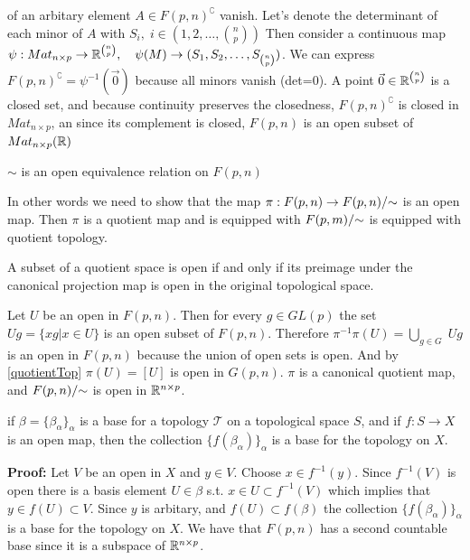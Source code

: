 \documentclass[11pt,a4paper]{report}
\begin{document}
of an arbitary element $ A \in F(p,n)^\complement$ vanish. Let's denote the determinant of each minor of $A$ with $S_i, \; i\in (1,2, \dots ,  {n \choose p})$ 
Then consider a continuous map
$ \psi: Mat_{n \times p} \to \mathbb{R}^{ n \choose p}, \quad \psi(M) \to (S_1,S_2, \dots, S_{n \choose p})$.
We can express $F(p,n)^\complement = \psi ^{-1} ( \vec{0} )$ because all minors vanish (det=0).
A point $ \vec{0} \in \mathbb{R}^{n \choose p}$ is a closed set, and because continuity preserves the closedness, $F(p,n)^\complement$ is closed in $Mat_{n \times p}$,
an since its complement is closed, $F(p,n)$ is an open subset of $Mat_{n \times p}(\mathbb{R})$
\begin{Prop}
    $\sim$ is an open equivalence relation on $F(p,n)$
\end{Prop}
In other words we need to show that the map $\pi: F(p,n) \to F(p,n)/{\sim}$ is an open map.
Then $\pi$ is a quotient map and is equipped with $F(p,m)/{\sim}$ is equipped with quotient topology.
\newline
\begin{Lemma} \label{quotientTop}
    A subset of a quotient space is open if and only if its
    preimage under the canonical projection map is open in the original topological space.
\end{Lemma}
Let $U$ be an open in $F(p,n)$. Then for every $g \in GL(p)$ the set $U g = \{ x g | x \in U \}$ is an open subset of $F(p,n)$.
Therefore $\pi^{-1}\pi(U) = \displaystyle \bigcup_{g \in G} \; U g$ is an open in $F(p,n)$ because the union of open sets is open.
And by \ref{quotientTop} $\pi(U) = [U]$ is open in $G(p,n)$. $\pi$ is a canonical quotient map, and $F(p,n)/{\sim}$ is open in $\mathbb{R}^{n \times p}$. 
\begin{Lemma}
    \label{baset}
    if $\beta = \{ \beta_\alpha \}_\alpha$ is a base for a topology $\mathcal{T}$ on a topological space $S$,
    and if $f: S \to X$ is an open map, then the collection $\{ f (\beta_\alpha) \}_\alpha$ is a base for the topology on $X$.
\end{Lemma}
\textbf{Proof:} Let $V$ be an open in $X$ and $y \in V$. Choose $x \in f^{-1}(y)$. 
Since $f^{-1} (V)$ is open there is a basis element $U \in \beta$ s.t. $x \in U \subset f^{-1}(V)$
which implies that $y \in f(U) \subset V$. Since $y$ is arbitary, and $f(U) \subset f(\beta)$ the collection $\{ f (\beta_\alpha) \}_\alpha$ is a base for the topology on $X$.
\newline
\newline
We have that $F(p,n)$ has a second countable base since it is a subspace of $\mathbb{R}^{n \times p}$.
\end{document}
